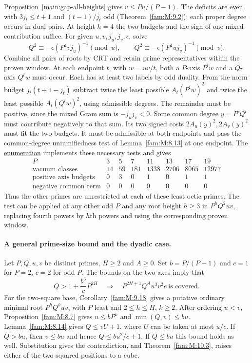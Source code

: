 \documentclass[11pt,a4paper]{article}
\numberwithin{equation}{section}
\theoremstyle{remark}
\begin{document}
Proposition~\ref{main:gap-all-heights} gives $v\le Pu/(P-1)$.
The deficits are even, with $3j_t\le t+1$ and $(t-1)/j_t$ odd
(Theorem~\ref{fam:M:9.2}); each proper degree occurs in dual pairs.
At height $h=4$ the two budgets and the sign of one mixed
contribution suffice. For given
$u,v,j_u,j_v,\epsilon$, solve
\[
 Q^2\equiv-\epsilon(P^4v j_u)^{-1}\pmod u,\qquad
 Q^2\equiv-\epsilon(P^4u j_v)^{-1}\pmod v .
\]
Combine all pairs of roots by CRT and retain prime representatives
within the proven window. At each endpoint $t$, with $w=uv/t$,
both a $P$-axis $P^iw$ and a $Q$-axis $Q^lw$ must occur. Each has
at least two labels by odd duality. From the norm budget
$j_t(t+1-j_t)$ subtract twice the least possible $A_t(P^iw)^2$
and twice the least possible $A_t(Q^lw)^2$, using admissible degrees.
The remainder must be positive, since the mixed Gram sum is
$-j_u j_v<0$. Some common degree $y=P^iQ^l$ must contribute
negatively to that sum. Its two signed costs $2A_u(y)^2,2A_v(y)^2$
must fit the two budgets. It must be admissible at both endpoints and
pass the common-degree unramifiedness test of Lemma~\ref{fam:M:8.13} at one
endpoint. The \href{https://github.com/sebastienpalcoux/WGT-fusion-categories/blob/f7f9f9a02f3116e61eb9dca4eebfed77001494e8/code/four_primes/new_odd.py}{enumeration} implements these
necessary tests and gives
\[
\begin{array}{c|rrrrrrr}
 P&3&5&7&11&13&17&19\\\hline
 \text{vacuum classes}&14&59&181&1338&2706&8065&12977\\
 \text{positive axis budgets}&0&3&0&1&0&1&1\\
 \text{negative common term}&0&0&0&0&0&0&0
\end{array}
\]
Thus the other primes are unrestricted at each of these least octic
primes. The test can be applied at any other odd $P$ and any root
height $h\ge3$ in $P^hQ^2uv$, replacing fourth powers by $h$th
powers and using the corresponding proven window.
\paragraph{A general prime-size bound and the dyadic case.} Let $P,Q,u,v$ be distinct primes, $H\ge2$ and $A\ge0$. Set
$b=P/(P-1)$ and $c=1$ for $P=2$, $c=2$ for odd $P$.
The bounds on the two axes imply that
\[
      Q>1+\frac{b^3}{c}P^{2H}
      \quad\Longrightarrow\quad P^{2H+1}Q^A u^3v^2e\ \text{is covered}.
\]
For the two-square base, Corollary~\ref{fam:M:9.18} gives a putative ordinary
minimal root $P^hQ^k uv$, with $P$ least and $2\le h\le H$, $k\ge2$.
After ordering $u<v$, Proposition~\ref{fam:M:8.7} gives $u\le bP^h$ and
$\min(Q,v)\le bu$. Lemma~\ref{fam:M:8.14} gives $Q\le vU+1$, where
$U$ can be taken at most $u/c$. If $Q>bu$, then $v\le bu$
and hence $Q\le bu^2/c+1$. If $Q\le bu$ this bound holds as well.
Substitution gives the contradiction, and Theorem~\ref{fam:M:10.3},
raises either of the two squared positions to a cube.
\end{document}
